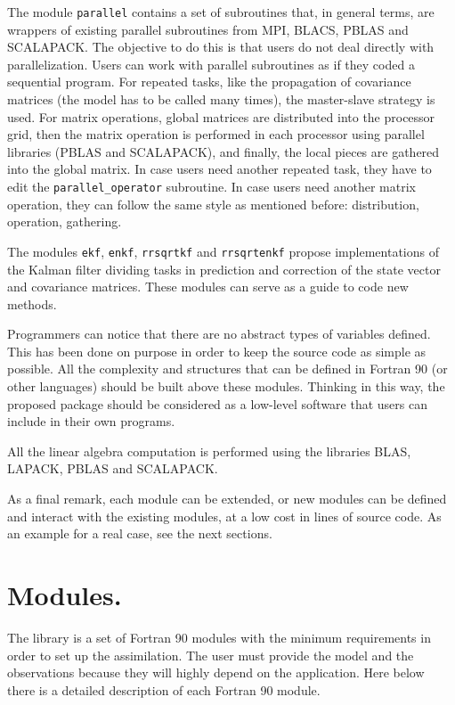 \documentclass[12pt]{article}
\begin{document}
The module {\tt parallel} contains a set of subroutines that, in general terms, are wrappers of existing parallel subroutines from MPI, BLACS, PBLAS and SCALAPACK. The objective to do this is that users do not deal directly with parallelization. Users can work with parallel subroutines as if they coded a sequential program. For repeated tasks, like the propagation of covariance matrices (the model has to be called many times), the master-slave strategy is used. For matrix operations, global matrices are distributed into the processor grid, then the matrix operation is performed in each processor using parallel libraries (PBLAS and SCALAPACK), and finally, the local pieces are gathered into the global matrix. In case users need another repeated task, they have to edit the {\tt parallel\_operator} subroutine. In case users need another matrix operation, they can follow the same style as mentioned before: distribution, operation, gathering.

The modules {\tt ekf}, {\tt enkf}, {\tt rrsqrtkf} and {\tt rrsqrtenkf} propose implementations of the Kalman filter dividing tasks in prediction and correction of the state vector and covariance matrices. These modules can serve as a guide to code new methods.

Programmers can notice that there are no abstract types of variables defined. This has been done on purpose in order to keep the source code as simple as possible. All the complexity and structures that can be defined in Fortran 90 (or other languages) should be built above these modules. Thinking in this way, the proposed package should be considered as a low-level software that users can include in their own programs. 

All the linear algebra computation is performed using the libraries BLAS, LAPACK, PBLAS and SCALAPACK.

As a final remark, each module can be extended, or new modules can be defined and interact with the existing modules, at a low cost in lines of source code. As an example for a real case, see the next sections.

\section{Modules.}
The library is a set of Fortran 90 modules with the minimum requirements in order to set up the assimilation. The user must provide the model and the observations because they will highly depend on the application. Here below there is a detailed description of each Fortran 90 module. 
\end{document}
